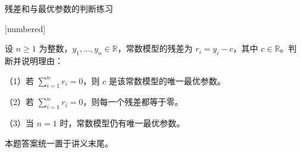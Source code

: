 \documentclass[aspectratio=169,10pt,fontset=fandol]{ctexbeamer}
\makeatletter
\newcommand{\mathagentexerciselabelcontext}[1]{%
\hypertarget<1>{#1}{}%
\edef\@currentHref{#1}%
}
\makeatother
\begin{document}
\begin{frame}[t,fragile]{残差和与最优参数的判断练习}
\normalsize
{\normalsize
[numbered]
\mathagentexerciselabelcontext{mathagent.exercise.U0015.0}
\begin{exercise}
\label{mathagent:exercise:9e7dbf7ef17df1506f236bbf1ad6ff8c14ff13065df89e12b796d18475228be7}
设 $n\geq1$ 为整数，$y_1,\ldots,y_n\in\mathbb{R}$，常数模型的残差为 $r_i=y_i-c$，其中 $c\in\mathbb{R}$。判断并说明理由：

（1）若 $\sum_{i=1}^{n}r_i=0$，则 $c$ 是该常数模型的唯一最优参数。

（2）若 $\sum_{i=1}^{n}r_i=0$，则每一个残差都等于零。

（3）当 $n=1$ 时，常数模型仍有唯一最优参数。

本题答案统一置于讲义末尾。
\end{exercise}
}
\end{frame}
\end{document}

